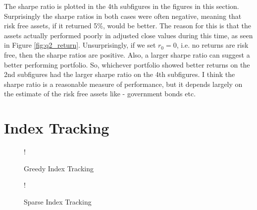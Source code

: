 \documentclass[11pt]{article}
\begin{document}
The sharpe ratio is plotted in the 4th subfigures in the figures in this section. Surprisingly the sharpe
ratios in both cases were often negative, meaning that risk free assets, if it returned 5\%, would be better.
The reason for this is that the assets actually performed poorly in adjusted close values during this
time, as seen in Figure \ref{fig:q2_return}. Unsurprisingly, if we set $r_0 = 0$, i.e. no returns are risk free,
then the sharpe ratios are positive. Also, a larger sharpe ratio can suggest a better performing portfolio. So, whichever portfolio showed
better returns on the 2nd subfigures had the larger sharpe ratio on the 4th subfigures. I think the sharpe ratio
is a reasonable measure of performance, but it depends largely on the estimate of the risk free assets like -
government bonds etc.

\section{Index Tracking}

\begin{figure}[!h]
   \centering 
 	 {!} { }
    \caption{Greedy Index Tracking}
	\label{fig:q2-all-based-on-first}
	\vspace{-0.5cm}
\end{figure}


\begin{figure}[!h]
   \centering 
 	 {!} { }
    \caption{Sparse Index Tracking}
	\label{fig:q2-all-based-on-first}
	\vspace{-0.5cm}
\end{figure}
\end{document}
